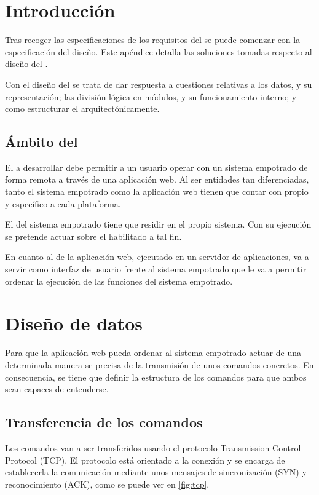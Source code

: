  \label{ch:design}

\section{Introducción} \label{sec:design-intro}
Tras recoger las especificaciones de los requisitos del \sw{} se 
puede comenzar con la especificación del diseño. Este apéndice detalla
las soluciones tomadas respecto al diseño del \sw{}.

Con el diseño del \sw{} se trata de dar respuesta a cuestiones relativas a los
datos, y su representación; las división lógica en módulos, y su funcionamiento
interno; y como estructurar el \sw{} arquitectónicamente.

\subsection{Ámbito del \sw{}} \label{sec:design-ambito}
El \sw{} a desarrollar debe permitir a un usuario operar con un
sistema empotrado de forma remota a través de una aplicación web. Al ser
entidades tan diferenciadas, tanto el sistema empotrado como la aplicación web
tienen que contar con \sw{} propio y específico a cada plataforma.

El \sw{} del sistema empotrado tiene que residir en el propio sistema. Con su
ejecución se pretende actuar sobre el \hw{} habilitado a tal fin.

En cuanto al \sw{} de la aplicación web, ejecutado en un servidor de aplicaciones, va a
servir como interfaz de usuario frente al sistema empotrado que le va a permitir
ordenar la ejecución de las funciones del sistema empotrado.



\section{Diseño de datos} \label{sec:design-datos}
Para que la aplicación web pueda ordenar al sistema empotrado actuar de una
determinada manera se precisa de la transmisión de unos comandos concretos. En
consecuencia, se tiene que definir la estructura de los comandos para que ambos
 sean capaces de entenderse.


\subsection{Transferencia de los comandos} \label{sec:design-transferencia}
Los comandos van a ser transferidos usando el protocolo Transmission Control
Protocol (TCP). El protocolo está orientado a la conexión y se encarga de
establecerla la comunicación mediante unos mensajes de sincronización (SYN) y
reconocimiento (ACK), como se puede ver en \ref{fig:tcp}.

